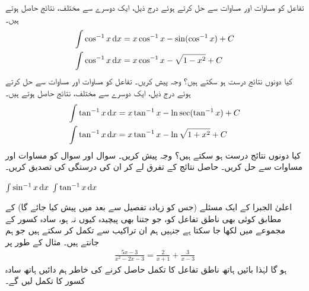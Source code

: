 تفاعل  کو مساوات  اور مساوات  سے حل کرتے ہوئے درج ذیل، ایک دوسرے سے مختلف، نتائج حاصل ہوتے ہیں۔
\begin{gather}
\begin{aligned}
\int \cos^{-1}x\dif x&=x\cos^{-1}x-\sin(\cos^{-1} x)+C\\
\int \cos^{-1}x\dif x&=x\cos^{-1}x-\sqrt{1-x^2}+C
\end{aligned}
\end{gather}
کیا دونوں نتائج درست ہو سکتے ہیں؟ وجہ پیش کریں۔
تفاعل  کو مساوات  اور مساوات  سے حل کرتے ہوئے درج ذیل، ایک دوسرے سے مختلف، نتائج حاصل ہوتے ہیں۔
\begin{gather}
\begin{aligned}
\int \tan^{-1}x\dif x&=x\tan^{-1}x-\ln\sec(\tan^{-1}x)+C\\
\int \tan^{-1}x\dif x&=x\tan^{-1}x-\ln{\sqrt{1+x^2}}+C
\end{aligned}
\end{gather}
کیا دونوں نتائج درست ہو سکتے ہیں؟ وجہ پیش کریں۔
سوال  اور سوال  کو مساوات  اور مساوات  سے حل کریں۔  حاصل  نتائج کے تفرق لے کر   ان   کی درستگی کی تصدیق کریں۔

$\int \sin^{-1}x\dif x$
$\int \tan^{-1}x\dif x$




اعلیٰ الجبرا کے  ایک مسئلے (جس کو زیادہ تفصیل سے بعد میں پیش کیا جائے گا)  کے مطابق  کوئی بھی ناطق تفاعل کو، جو جتنا بھی پیچیدہ کیوں نہ ہو،  سادہ کسور    کے  مجموعے میں لکھا جا سکتا ہے جنہیں ہم ان  تراکیب سے تکمل کر سکتے ہیں جو ہم جانتے ہیں۔ مثال کے طور پر
\begin{align}\label{مساوات_طریقہ_جزوی_کسر_الف}
\frac{5x-3}{x^2-2x-3}=\frac{2}{x+1}+\frac{3}{x-3}
\end{align}
ہو گا لہٰذا بائیں ہاتھ ناطق تفاعل کا تکمل حاصل کرنے کی خاطر ہم دائیں ہاتھ  سادہ کسور   کا تکمل لیں گے۔

